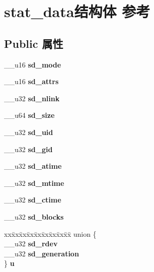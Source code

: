\hypertarget{structstat__data}{}\section{stat\+\_\+data结构体 参考}
\label{structstat__data}
\subsection*{Public 属性}
\begin{DoxyCompactItemize}
\item 
\mbox{\label{structstat__data_af060d7451fa716098e27d545234743de}} 
\+\_\+\+\_\+u16 {\bfseries sd\+\_\+mode}
\item 
\mbox{\label{structstat__data_a26de03b2161653d55d7028443bb6eb4f}} 
\+\_\+\+\_\+u16 {\bfseries sd\+\_\+attrs}
\item 
\mbox{\label{structstat__data_a7f4dd24b9cedd888c03c628dca990614}} 
\+\_\+\+\_\+u32 {\bfseries sd\+\_\+nlink}
\item 
\mbox{\label{structstat__data_a3f18f02587d9328d321adc58ea5ef70d}} 
\+\_\+\+\_\+u64 {\bfseries sd\+\_\+size}
\item 
\mbox{\label{structstat__data_a296f31226d1907991077902da3b99c86}} 
\+\_\+\+\_\+u32 {\bfseries sd\+\_\+uid}
\item 
\mbox{\label{structstat__data_a1589afffe611002c2ad727eedcc06e90}} 
\+\_\+\+\_\+u32 {\bfseries sd\+\_\+gid}
\item 
\mbox{\label{structstat__data_a90b6af76f116a800b797d1a5805c6651}} 
\+\_\+\+\_\+u32 {\bfseries sd\+\_\+atime}
\item 
\mbox{\label{structstat__data_a9902e0ed18c5f805e3a3503c0ed965c6}} 
\+\_\+\+\_\+u32 {\bfseries sd\+\_\+mtime}
\item 
\mbox{\label{structstat__data_a33d53303750c704bedd8e397d663353e}} 
\+\_\+\+\_\+u32 {\bfseries sd\+\_\+ctime}
\item 
\mbox{\label{structstat__data_a787042b8890a07e1507a03f21d975dff}} 
\+\_\+\+\_\+u32 {\bfseries sd\+\_\+blocks}
\item 
\mbox{\label{structstat__data_a677cdc604577084db48a5f58f475e0e9}} 
\begin{tabbing}
xx\=xx\=xx\=xx\=xx\=xx\=xx\=xx\=xx\=\kill
union \{\\
\>\_\_u32 {\bfseries sd\_rdev}\\
\>\_\_u32 {\bfseries sd\_generation}\\
\} {\bfseries u}\\


\end{tabbing}
\end{DoxyCompactItemize}
